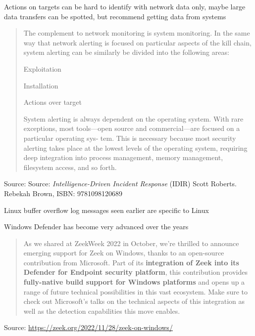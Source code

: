 \documentclass[Screen16to9,17pt]{foils}
\begin{document}
Actions on targets can be hard to identify with network data only,
maybe large data transfers can be spotted, but recommend getting data from systems



\begin{quote}\small
The complement to network monitoring is system monitoring. In the same way that
network alerting is focused on particular aspects of the kill chain, system alerting can
be similarly be divided into the following areas:
\begin{list2}
\item Exploitation
\item Installation
\item Actions over target
\end{list2}
System alerting is always dependent on the operating system. With rare exceptions,
most tools—open source and commercial—are focused on a particular operating sys‐
tem. This is necessary because most security alerting takes place at the lowest levels of
the operating system, requiring deep integration into process management, memory
management, filesystem access, and so forth.
\end{quote}
Source: Source: \emph{Intelligence-Driven Incident Response} (IDIR)
 Scott Roberts. Rebekah Brown, ISBN: 9781098120689

\begin{list2}
\item Linux buffer overflow log messages seen earlier are specific to Linux
\item Windows Defender has become very advanced over the years
\end{list2}




\begin{quote}
As we shared at ZeekWeek 2022 in October, we’re thrilled to announce emerging support for Zeek on Windows, thanks to an open-source contribution from Microsoft. Part of its {\bf integration of Zeek into its Defender for Endpoint security platform}, this contribution provides {\bf fully-native build support for Windows platforms} and opens up a range of future technical possibilities in this vast ecosystem. Make sure to check out Microsoft’s talks on the technical aspects of this integration as well as the detection capabilities this move enables.
\end{quote}
Source: \url{https://zeek.org/2022/11/28/zeek-on-windows/}
\end{document}
